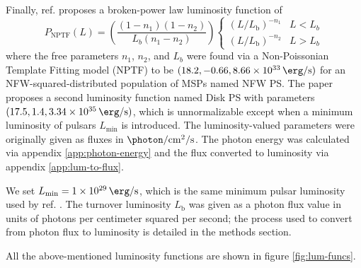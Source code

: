 \documentclass[a4paper,11pt]{article}
\newcommand{\parens}[1]{\left(#1\right)}
\newcommand{\fraci}[2]{#1 / #2}
\newcommand{\comment}[1]{\emph{\color{red}{#1}}}
\begin{document}
Finally, ref. \cite{Lee:2015fea} proposes a broken-power law luminosity function of
\begin{equation}
    P_\text{NPTF}(L) = \parens{\frac{\parens{1-n_1}\parens{1-n_2}}{L_b \parens{n_1 - n_2}}}\begin{cases}
        \parens{\fraci{L}{L_\text{b}}}^{-n_{1}} & L < L_{b} \\
        \parens{\fraci{L}{L_\text{b}}}^{-n_{2}} & L > L_b
    \end{cases}
    \label{eqn:nptf}
\end{equation}
where the free parameters  $n_1$, $n_2$, and $L_b$ were found via a Non-Poissonian Template Fitting model (NPTF) to be $(18.2, -0.66, \SI{8.66e+33}{\erg\per\second})$ for an NFW-squared-distributed population of MSPs named NFW PS. The paper proposes a second luminosity function named Disk PS with parameters $(17.5, 1.4, \SI{3.34e+35}{\erg\per\second})$, which is unnormalizable except when a minimum luminosity of pulsars $L_\text{min}$ is introduced. \comment{I will want to remove the unnormalizable one. When should I do it?} The luminosity-valued parameters were originally given as fluxes in $\SI{}{\photon \per \centi\meter\squared \per \second}$. The photon energy was calculated via appendix \ref{app:photon-energy} and the flux converted to luminosity via appendix \ref{app:lum-to-flux}.

We set $L_\text{min}=\SI{1e29}{\erg\per\second}$, which is the same minimum pulsar luminosity used by ref. \cite{Zhong:2019ycb}. The turnover luminosity $L_\text{b}$ was given as a photon flux value in units of photons per centimeter squared per second; the process used to convert from photon flux to luminosity is detailed in the methods section.

All the above-mentioned luminosity functions are shown in figure \ref{fig:lum-funcs}.
\end{document}

